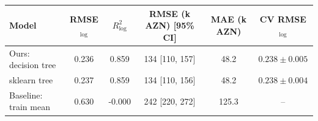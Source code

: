 \begin{tabular}{@{}lccccc@{}}
\toprule
Model & RMSE$_{\log}$ & $R^2_{\log}$ & RMSE (k AZN) [95\% CI] & MAE (k AZN) & CV RMSE$_{\log}$ \\
\midrule
Ours: decision tree & 0.236 & 0.859 & 134 [110, 157] & 48.2 & $0.238\pm0.005$ \\
sklearn tree & 0.237 & 0.859 & 134 [110, 156] & 48.2 & $0.238\pm0.004$ \\
Baseline: train mean & 0.630 & -0.000 & 242 [220, 272] & 125.3 & -- \\
\bottomrule
\end{tabular}

